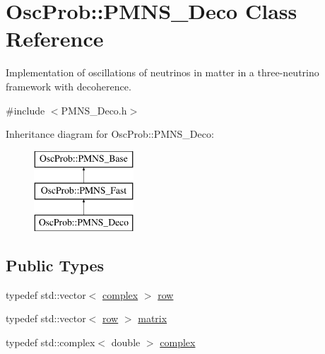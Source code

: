 \hypertarget{classOscProb_1_1PMNS__Deco}{}\section{Osc\+Prob\+:\+:P\+M\+N\+S\+\_\+\+Deco Class Reference}
\label{classOscProb_1_1PMNS__Deco}


Implementation of oscillations of neutrinos in matter in a three-\/neutrino framework with decoherence.  




{\ttfamily \#include $<$P\+M\+N\+S\+\_\+\+Deco.\+h$>$}

Inheritance diagram for Osc\+Prob\+:\+:P\+M\+N\+S\+\_\+\+Deco\+:\begin{figure}[H]
\begin{center}
\leavevmode
\includegraphics[height=3.000000cm]{classOscProb_1_1PMNS__Deco}
\end{center}
\end{figure}
\subsection*{Public Types}
\begin{DoxyCompactItemize}
\item 
typedef std\+::vector$<$ \hyperlink{classOscProb_1_1PMNS__Base_ae86ec4718808ce9d02e5f5b4226714ab}{complex} $>$ \hyperlink{classOscProb_1_1PMNS__Deco_a34634741bc68bc1c524cf47f44e7f5b6}{row}
\item 
typedef std\+::vector$<$ \hyperlink{classOscProb_1_1PMNS__Deco_a34634741bc68bc1c524cf47f44e7f5b6}{row} $>$ \hyperlink{classOscProb_1_1PMNS__Deco_a77b4e0c041b6268910a270be0f5387c9}{matrix}
\item 
typedef std\+::complex$<$ double $>$ \hyperlink{classOscProb_1_1PMNS__Base_ae86ec4718808ce9d02e5f5b4226714ab}{complex}
\end{DoxyCompactItemize}
